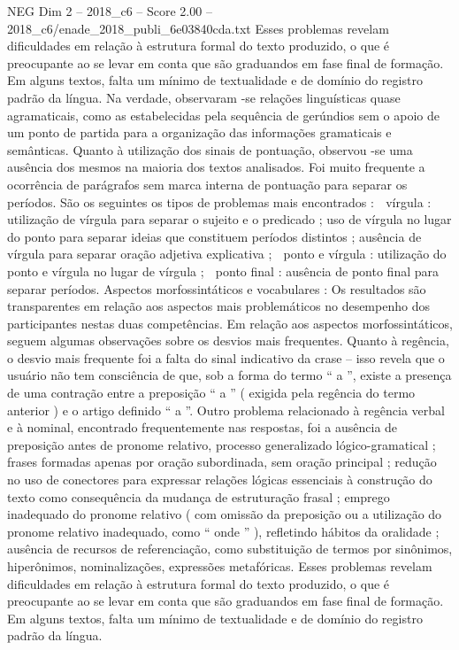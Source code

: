 \begin{textsample}{NEG Dim 2 – 2018\_c6 – Score 2.00 – 2018\_c6/enade\_2018\_publi\_6e03840cda.txt}
Esses problemas revelam dificuldades em relação à estrutura formal do texto produzido, o que é preocupante ao se levar em conta que são graduandos em fase final de formação.
Em alguns textos, falta um mínimo de textualidade e de domínio do registro padrão da língua.
Na verdade, observaram -se relações linguísticas quase agramaticais, como as estabelecidas pela sequência de gerúndios sem o apoio de um ponto de partida para a organização das informações gramaticais e semânticas.
Quanto à utilização dos sinais de pontuação, observou -se uma ausência dos mesmos na maioria dos textos analisados.
Foi muito frequente a ocorrência de parágrafos sem marca interna de pontuação para separar os períodos.
São os seguintes os tipos de problemas mais encontrados :  vírgula : utilização de vírgula para separar o sujeito e o predicado ; uso de vírgula no lugar do ponto para separar ideias que constituem períodos distintos ; ausência de vírgula para separar oração adjetiva explicativa ;  ponto e vírgula : utilização do ponto e vírgula no lugar de vírgula ;  ponto final : ausência de ponto final para separar períodos.
Aspectos morfossintáticos e vocabulares : Os resultados são transparentes em relação aos aspectos mais problemáticos no desempenho dos participantes nestas duas competências.
Em relação aos aspectos morfossintáticos, seguem algumas observações sobre os desvios mais frequentes.
Quanto à regência, o desvio mais frequente foi a falta do sinal indicativo da crase – isso revela que o usuário não tem consciência de que, sob a forma do termo “ a ”, existe a presença de uma contração entre a preposição “ a ” ( exigida pela regência do termo anterior ) e o artigo definido “ a ”.
Outro problema relacionado à regência verbal e à nominal, encontrado frequentemente nas respostas, foi a ausência de preposição antes de pronome relativo, processo generalizado lógico-gramatical ; frases formadas apenas por oração subordinada, sem oração principal ; redução no uso de conectores para expressar relações lógicas essenciais à construção do texto como consequência da mudança de estruturação frasal ; emprego inadequado do pronome relativo ( com omissão da preposição ou a utilização do pronome relativo inadequado, como “ onde ” ), refletindo hábitos da oralidade ; ausência de recursos de referenciação, como substituição de termos por sinônimos, hiperônimos, nominalizações, expressões metafóricas.
Esses problemas revelam dificuldades em relação à estrutura formal do texto produzido, o que é preocupante ao se levar em conta que são graduandos em fase final de formação.
Em alguns textos, falta um mínimo de textualidade e de domínio do registro padrão da língua.

\end{textsample}
